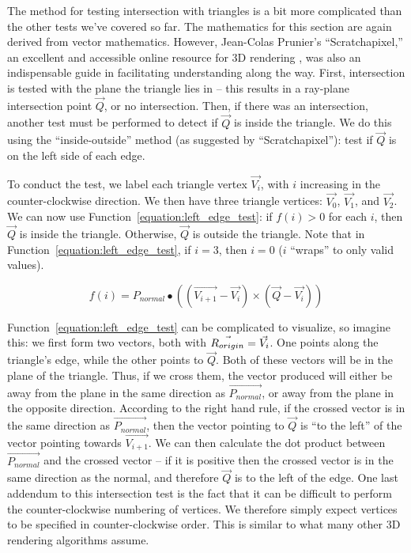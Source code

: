 
The method for testing intersection with triangles is a bit more complicated than the other tests we've covered so far.
The mathematics for this section are again derived from vector mathematics.
However, Jean-Colas Prunier's ``Scratchapixel,'' an excellent and accessible online resource for 3D rendering \cite{prunier2017triangle}, was also an indispensable guide in facilitating understanding along the way.
First, intersection is tested with the plane the triangle lies in -- this results in a ray-plane intersection point $\vec{Q}$, or no intersection.
Then, if there was an intersection, another test must be performed to detect if $\vec{Q}$ is inside the triangle.
We do this using the ``inside-outside'' method (as suggested by ``Scratchapixel''): test if $\vec{Q}$ is on the left side of each edge.

To conduct the test, we label each triangle vertex $\vec{V_i}$, with $i$ increasing in the counter-clockwise direction.
We then have three triangle vertices: $\vec{V_0}$, $\vec{V_1}$, and $\vec{V_2}$.
We can now use Function~\ref{equation:left_edge_test}: if $f(i) > 0$ for each $i$, then $\vec{Q}$ is inside the triangle.
Otherwise, $\vec{Q}$ is outside the triangle.
Note that in Function~\ref{equation:left_edge_test}, if $i = 3$, then $i = 0$ ($i$ ``wraps'' to only valid values).

\begin{equation}
  \label{equation:left_edge_test}
  f(i) = P_{normal} \bullet ((\vec{V_{i+1}} - \vec{V_i}) \times (\vec{Q} - \vec{V_i}))
\end{equation}

Function~\ref{equation:left_edge_test} can be complicated to visualize, so imagine this: we first form two vectors, both with $\vec{R_{origin}} = \vec{V_i}$.
One points along the triangle's edge, while the other points to $\vec{Q}$.
Both of these vectors will be in the plane of the triangle.
Thus, if we cross them, the vector produced will either be away from the plane in the same direction as $\vec{P_{normal}}$, or away from the plane in the opposite direction.
According to the right hand rule, if the crossed vector is in the same direction as $\vec{P_{normal}}$, then the vector pointing to $\vec{Q}$ is ``to the left'' of the vector pointing towards $\vec{V_{i+1}}$.
We can then calculate the dot product between $\vec{P_{normal}}$ and the crossed vector -- if it is positive then the crossed vector is in the same direction as the normal, and therefore $\vec{Q}$ is to the left of the edge.
One last addendum to this intersection test is the fact that it can be difficult to perform the counter-clockwise numbering of vertices.
We therefore simply expect vertices to be specified in counter-clockwise order.
This is similar to what many other 3D rendering algorithms assume.


